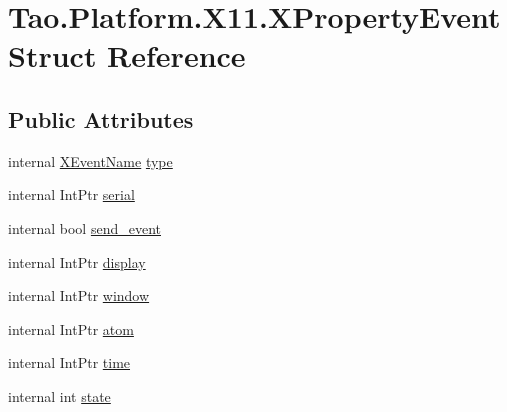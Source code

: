 \hypertarget{struct_tao_1_1_platform_1_1_x11_1_1_x_property_event}{
\section{Tao.Platform.X11.XPropertyEvent Struct Reference}
\label{struct_tao_1_1_platform_1_1_x11_1_1_x_property_event}
}
\subsection*{Public Attributes}
\begin{DoxyCompactItemize}
\item 
internal \hyperlink{namespace_tao_1_1_platform_1_1_x11_aff81ed5b8778e1ea8e872861dff9f146}{XEventName} \hyperlink{struct_tao_1_1_platform_1_1_x11_1_1_x_property_event_ac5e72c53624186acb84f3976fd078feb}{type}
\item 
internal IntPtr \hyperlink{struct_tao_1_1_platform_1_1_x11_1_1_x_property_event_a08e3b7fb79dd99c1bbd6d26691d3f30d}{serial}
\item 
internal bool \hyperlink{struct_tao_1_1_platform_1_1_x11_1_1_x_property_event_a37ae29eb4ae48eca0a4dde13c1f32c10}{send\_\-event}
\item 
internal IntPtr \hyperlink{struct_tao_1_1_platform_1_1_x11_1_1_x_property_event_a2e8432d1b694417a2611377b6eded2eb}{display}
\item 
internal IntPtr \hyperlink{struct_tao_1_1_platform_1_1_x11_1_1_x_property_event_a4119919dd784782a78d1208a3ffccbc7}{window}
\item 
internal IntPtr \hyperlink{struct_tao_1_1_platform_1_1_x11_1_1_x_property_event_a7e3ebaee82f66a484fe4d9f093c55b87}{atom}
\item 
internal IntPtr \hyperlink{struct_tao_1_1_platform_1_1_x11_1_1_x_property_event_a90ce1efce45ed95d0b782f24f9310a7d}{time}
\item 
internal int \hyperlink{struct_tao_1_1_platform_1_1_x11_1_1_x_property_event_acf33975eca9f44be0ab2b30a6baf41c5}{state}
\end{DoxyCompactItemize}



